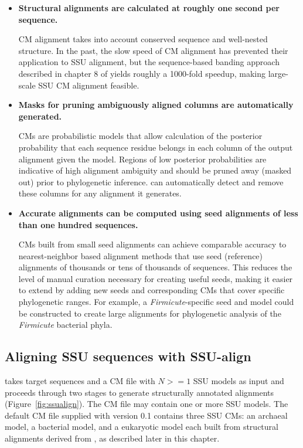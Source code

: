 \begin{itemize}

\item \textbf{Structural alignments are calculated at roughly one
  second per sequence.}  

  CM alignment takes into account conserved sequence and well-nested
  structure. In the past, the slow speed of CM alignment has prevented
  their application to SSU alignment, but the sequence-based banding
  approach described in chapter 8 of \cite{Nawrocki09b} yields roughly a 1000-fold speedup,
  making large-scale SSU CM alignment feasible.

\item \textbf{Masks for pruning ambiguously aligned columns are
  automatically generated.}
  
  CMs are probabilistic models that allow calculation of the posterior
  probability that each sequence residue belongs in each column of the
  output alignment given the model. Regions of low posterior
  probabilities are indicative of high alignment ambiguity and
  should be pruned away (masked out) prior to phylogenetic
  inference.  can automatically detect and remove
  these columns for any alignment it generates.

\item \textbf{Accurate alignments can be computed using seed
  alignments of less than one hundred sequences.}

  CMs built from small seed alignments %
  can achieve comparable accuracy to nearest-neighbor based alignment
  methods that use seed (reference) alignments of thousands or tens of
  thousands of sequences. This reduces the level of manual curation
  necessary for creating useful seeds, making it easier to extend
   by adding new seeds and corresponding CMs that cover
  specific phylogenetic ranges. For example, a
  \emph{Firmicute}-specific seed and model could be constructed to
  create large alignments for phylogenetic analysis of the \emph{Firmicute}
  bacterial phyla.

\end{itemize}

\subsection{Aligning SSU sequences with SSU-align}

 takes target sequences and a CM file with $N >=
1$ SSU models as input and proceeds through two stages to generate
structurally annotated alignments (Figure~\ref{fig:ssualign}).  The CM
file
may contain one or more SSU models. The default CM file supplied with
 version 0.1 contains three SSU CMs: an archaeal model,
a bacterial model, and a eukaryotic model each
built from structural alignments derived from 
\cite{CannoneGutell02}, as described later in this chapter. 


